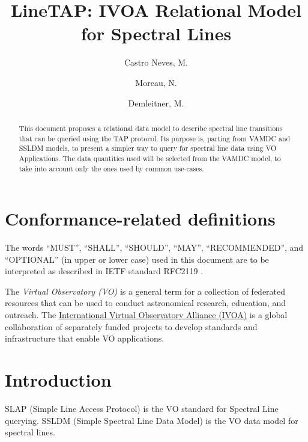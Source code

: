 \documentclass[11pt,a4paper]{ivoa}
\title{LineTAP: IVOA Relational Model for Spectral Lines}
\author{Castro Neves, M.}
\author{Moreau, N.}
\author{Demleitner, M.}
\begin{document}
\begin{abstract}

This document proposes a relational data model to describe spectral line
transitions that can be queried using the TAP protocol. Its purpose is,
parting from VAMDC and SSLDM models, to present a simpler way to query
for spectral line data using VO Applications. The data quantities used
will be selected from the VAMDC model, to take into account only the
ones used by common use-cases.


\end{abstract}




\section*{Conformance-related definitions}

The words ``MUST'', ``SHALL'', ``SHOULD'', ``MAY'', ``RECOMMENDED'', and
``OPTIONAL'' (in upper or lower case) used in this document are to be
interpreted as described in IETF standard RFC2119 \citep{std:RFC2119}.

The \emph{Virtual Observatory (VO)} is a
general term for a collection of federated resources that can be used
to conduct astronomical research, education, and outreach.
The \href{http://www.ivoa.net}{International
Virtual Observatory Alliance (IVOA)} is a global
collaboration of separately funded projects to develop standards and
infrastructure that enable VO applications.


\section{Introduction}


SLAP (Simple Line Access Protocol)\citep{2010ivoa.specQ1209O} is the VO
standard for Spectral Line querying. SSLDM (Simple Spectral Line Data
Model)\citep{2010ivoa.spec.1209O} is the VO data model for spectral
lines.
\end{document}
